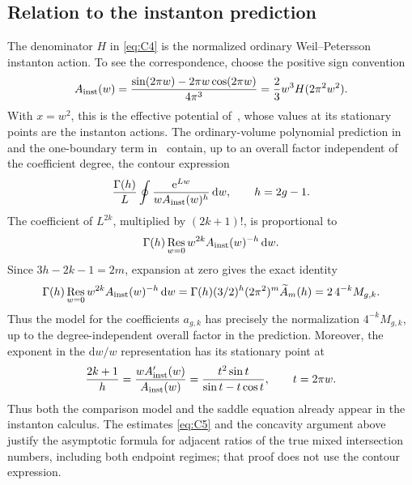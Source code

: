 \subsection{Relation to the instanton prediction}\label{subsec:instanton-model}
The denominator \(H\) in \eqref{eq:C4} is the normalized ordinary Weil--Petersson instanton action. To see the correspondence, choose the positive sign convention
\[
 A_{\rm inst}(w)=\frac{\sin(2\pi w)-2\pi w\cos(2\pi w)}{4\pi^3}
     =\frac23 w^3 H(2\pi^2w^2).
\]
With $x=w^2$, this is the effective potential of~\cite[equation~(3.15)]{EGGLS}, whose values at its stationary points are the instanton actions. The ordinary-volume polynomial prediction in~\cite[Section~3.3]{GPRS} and the one-boundary term in~\cite[equation~(4.22)]{JR} contain, up to an overall factor independent of the coefficient degree, the contour expression
\[
 \frac{\Gamma(h)}{L}\oint
       \frac{\mathrm{e}^{Lw}}{w A_{\rm inst}(w)^h}\,\mathrm{d}w,\qquad h=2g-1.
\]
The coefficient of \(L^{2k}\), multiplied by \((2k+1)!\), is proportional to
\[
 \Gamma(h)\operatorname*{Res}_{w=0} w^{2k}A_{\rm inst}(w)^{-h}\,\mathrm{d}w.
\]
Since \(3h-2k-1=2m\), expansion at zero gives the exact identity
\[
 \Gamma(h)\operatorname*{Res}_{w=0} w^{2k}A_{\rm inst}(w)^{-h}\,\mathrm{d}w
 =\Gamma(h)(3/2)^h(2\pi^2)^m \widetilde A_m(h)
 =2\,4^{-k}M_{g,k}.
\]
Thus the model for the coefficients \(a_{g,k}\) has precisely the normalization \(4^{-k}M_{g,k}\), up to the degree-independent overall factor in the prediction. Moreover, the exponent in the \(\mathrm{d}w/w\) representation has its stationary point at
\[
 \frac{2k+1}{h}=\frac{wA_{\rm inst}'(w)}{A_{\rm inst}(w)}
 =\frac{t^2\sin t}{\sin t-t\cos t},\qquad t=2\pi w.
\]
Thus both the comparison model and the saddle equation already appear in the instanton calculus. The estimates \eqref{eq:C5} and the concavity argument above justify the asymptotic formula for adjacent ratios of the true mixed intersection numbers, including both endpoint regimes; that proof does not use the contour expression.
